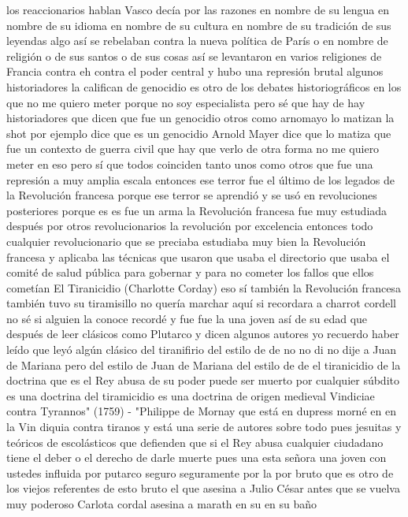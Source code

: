 los reaccionarios hablan Vasco decía por las razones en nombre de su lengua en nombre de su idioma
en nombre de su cultura en nombre de su tradición de sus leyendas algo así se rebelaban contra la nueva política de París
o en nombre de religión o de sus santos o de sus cosas así se levantaron en varios religiones de Francia
contra eh contra el poder central y hubo una represión brutal algunos historiadores la califican de genocidio
es otro de los debates historiográficos en los que no me quiero meter porque no soy especialista pero sé que hay de hay historiadores que dicen que fue un genocidio
otros como arnomayo lo matizan la shot por ejemplo dice que es un genocidio Arnold Mayer dice que lo matiza
que fue un contexto de guerra civil que hay que verlo de otra forma no me quiero meter en eso pero sí que todos coinciden tanto unos como otros
que fue una represión a muy amplia escala entonces ese terror
fue el último de los legados de la Revolución francesa porque ese terror se aprendió y se usó en revoluciones posteriores
porque es es fue un arma la Revolución francesa fue muy estudiada después por otros revolucionarios la revolución por excelencia
entonces todo cualquier revolucionario que se preciaba estudiaba muy bien la Revolución francesa y aplicaba las técnicas que usaron que usaba el directorio
que usaba el comité de salud pública para gobernar y para no cometer los fallos que ellos cometían
El Tiranicidio (Charlotte Corday)
eso sí también la Revolución francesa también tuvo su tiramisillo no quería marchar aquí si recordara a charrot cordell no sé si alguien la conoce
recordé y fue fue la una joven así de su edad que después de leer clásicos como Plutarco
y dicen algunos autores yo recuerdo haber leído que leyó algún clásico del tiranifirio del estilo de de no no di no dije a Juan de Mariana
pero del estilo de Juan de Mariana del estilo de de el tiranicidio de la doctrina que es el Rey
abusa de su poder puede ser muerto por cualquier súbdito es una doctrina del tiramicidio es una doctrina de origen medieval
Vindiciae contra Tyrannos" (1759) - "Philippe de Mornay
que está en dupress morné en en la Vin diquia contra tiranos y está una serie de autores sobre todo pues jesuitas y teóricos de escolásticos
que defienden que si el Rey abusa cualquier ciudadano tiene el deber o el derecho de darle muerte
pues una esta señora una joven con ustedes influida por putarco seguro seguramente por la por bruto
que es otro de los viejos referentes de esto bruto el que asesina a Julio César antes que se vuelva muy poderoso
Carlota cordal asesina a marath en su en su baño
